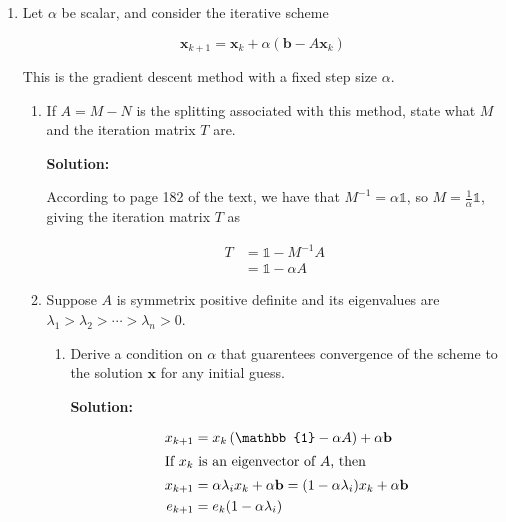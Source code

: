 \documentclass[12pt]{article}
\newcommand{\vect}{\mathbf}
\newcommand{\Id}{\mathbb{1}}
\newcommand{\inv}[1]{ #1^{-1}}
\begin{document}
\begin{enumerate}
\begin{enumerate}
  {\bf Solution:}

  A $3 \times 2$ matrix is not possible as both of these algorithms would produce
  the same result. This is due to the for loops, since both of these produce the same
  values for the first two columns in the matrix.
\end{enumerate}

\item Let $\alpha$ be scalar, and consider the iterative scheme

\[
\mathbf{x}_{k+1} = \mathbf{x}_{k} + \alpha\left(\mathbf{b} - A\mathbf{x}_{k} \right)
\]

This is the gradient descent method with a fixed step size $\alpha$.

\begin{enumerate}
  \item If $A = M - N$ is the splitting associated with this method, state what $M$
  and the iteration matrix $T$ are.

  {\bf Solution:}

  According to page 182 of the text, we have that $\inv{M} = \alpha \Id$, so $M = \frac{1}{\alpha}\Id$,
  giving the iteration matrix $T$ as

  \begin{align*}
    T &= \Id - \inv{M}A\\
      &= \Id - \alpha A
  \end{align*}

  \item Suppose $A$ is symmetrix positive definite and its eigenvalues are
  $\lambda_{1} > \lambda_{2} > \cdots > \lambda_{n} > 0$.

  \begin{enumerate}
    \item Derive a condition on $\alpha$ that guarentees convergence of the
    scheme to the solution $\mathbf{x}$ for any initial guess.

    {\bf Solution:}

    \begin{align*}
      x_{k+1} &= x_{k}\left( \Id - \alpha A\right) + \alpha \vect{b}\\
      \intertext{If $x_{k}$ is an eigenvector of $A$, then}
      x_{k+1} &= \alpha \lambda_{i} x_{k} + \alpha \vect{b} = (1 - \alpha \lambda_{i})x_{k} + \alpha \vect{b}\\
      e_{k+1} &= e_{k}(1 - \alpha \lambda_{i})
    \end{align*}


\end{enumerate}
\end{enumerate}
\end{enumerate}
\end{document}
